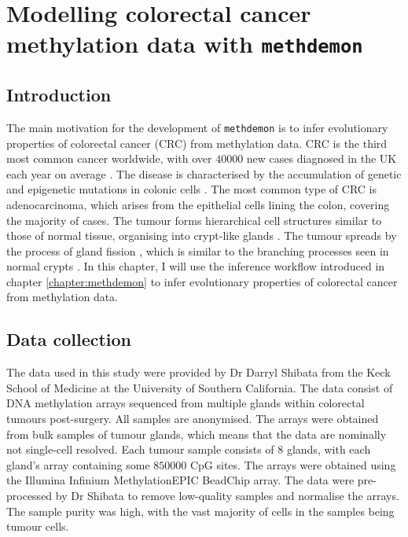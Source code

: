 \chapter{Modelling colorectal cancer methylation data with \texttt{methdemon}}
\label{chapter:methylation}

\section{Introduction}
The main motivation for the development of \texttt{methdemon} is to infer
evolutionary properties of colorectal cancer (CRC) from methylation data. CRC
is the third most common cancer worldwide, with over $40000$ new cases
diagnosed in the UK each year on average \cite{noauthor_bowel_2015}. The
disease is characterised by the accumulation of genetic and epigenetic
mutations in colonic cells \cite{fleming_colorectal_2012}. The most common type
of CRC is adenocarcinoma, which arises from the epithelial cells lining the
colon, covering the majority of cases. The tumour forms hierarchical cell
structures similar to those of normal tissue, organising into crypt-like glands
\cite{ponz_de_leon_pathology_2001}. The tumour spreads by the process of gland
fission \cite{preston_bottom-up_nodate}, which is similar to the branching
processes seen in normal crypts \cite{almet_multicellular_2018}. In this
chapter, I will use the inference workflow introduced in chapter
\ref{chapter:methdemon} to infer evolutionary properties of colorectal cancer
from methylation data.

\section{Data collection}
The data used in this study were provided by Dr Darryl Shibata from the Keck
School of Medicine at the University of Southern California. The data consist
of DNA methylation arrays sequenced from multiple glands within colorectal
tumours post-surgery. All samples are anonymised. The arrays were obtained from
bulk samples of tumour glands, which means that the data are nominally not
single-cell resolved. Each tumour sample consists of $8$ glands, with each
gland's array containing some $850000$ CpG sites. The arrays were obtained
using the Illumina Infinium MethylationEPIC BeadChip array. The data were
pre-processed by Dr Shibata to remove low-quality samples and normalise the
arrays. The sample purity was high, with the vast majority of cells in the
samples being tumour cells.

